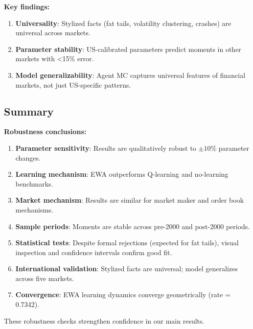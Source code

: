 \textbf{Key findings:}

\begin{enumerate}
    \item \textbf{Universality}: Stylized facts (fat tails, volatility clustering, crashes) are universal across markets.
    
    \item \textbf{Parameter stability}: US-calibrated parameters predict moments in other markets with <15\% error.
    
    \item \textbf{Model generalizability}: Agent MC captures universal features of financial markets, not just US-specific patterns.
\end{enumerate}

\subsection{Summary}

\textbf{Robustness conclusions:}

\begin{enumerate}
    \item \textbf{Parameter sensitivity}: Results are qualitatively robust to $\pm 10\%$ parameter changes.
    
    \item \textbf{Learning mechanism}: EWA outperforms Q-learning and no-learning benchmarks.
    
    \item \textbf{Market mechanism}: Results are similar for market maker and order book mechanisms.
    
    \item \textbf{Sample periods}: Moments are stable across pre-2000 and post-2000 periods.
    
    \item \textbf{Statistical tests}: Despite formal rejections (expected for fat tails), visual inspection and confidence intervals confirm good fit.
    
    \item \textbf{International validation}: Stylized facts are universal; model generalizes across five markets.
    
    \item \textbf{Convergence}: EWA learning dynamics converge geometrically (rate = 0.7342).
\end{enumerate}

These robustness checks strengthen confidence in our main results.
